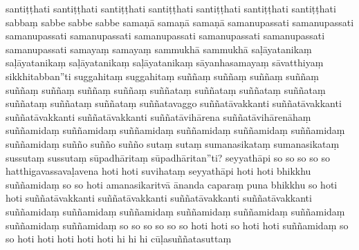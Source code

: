\documentclass[12pt]{article}
\begin{document}
\begin{multicols}{5}
santiṭṭhati
santiṭṭhati
santiṭṭhati
santiṭṭhati
santiṭṭhati
santiṭṭhati
santiṭṭhati
sabbaṃ
sabbe
sabbe
sabbe
samaṇā
samaṇā
samaṇā
samanupassati
samanupassati
samanupassati
samanupassati
samanupassati
samanupassati
samanupassati
samanupassati
samayaṃ
samayaṃ
sammukhā
sammukhā
saḷāyatanikaṃ
saḷāyatanikaṃ
saḷāyatanikaṃ
saḷāyatanikaṃ
sāyanhasamayaṃ
sāvatthiyaṃ
sikkhitabban”ti
suggahitaṃ
suggahitaṃ
suññaṃ
suññaṃ
suññaṃ
suññaṃ
suññaṃ
suññaṃ
suññaṃ
suññaṃ
suññataṃ
suññataṃ
suññataṃ
suññataṃ
suññataṃ
suññataṃ
suññataṃ
suññatavaggo
suññatāvakkanti
suññatāvakkanti
suññatāvakkanti
suññatāvakkanti
suññatāvihārena
suññatāvihārenāhaṃ
suññamidaṃ
suññamidaṃ
suññamidaṃ
suññamidaṃ
suññamidaṃ
suññamidaṃ
suññamidaṃ
suñño
suñño
suñño
sutaṃ
sutaṃ
sumanasikataṃ
sumanasikataṃ
sussutaṃ
sussutaṃ
sūpadhāritaṃ
sūpadhāritan”ti?
seyyathāpi
so
so
so
so
so
hatthigavassavaḷavena
hoti
hoti
suvihataṃ
seyyathāpi
hoti
hoti
bhikkhu
suññamidaṃ
so
so
hoti
amanasikaritvā
ānanda
caparaṃ
puna
bhikkhu
so
hoti
hoti
suññatāvakkanti
suññatāvakkanti
suññatāvakkanti
suññatāvakkanti
suññamidaṃ
suññamidaṃ
suññamidaṃ
suññamidaṃ
suññamidaṃ
suññamidaṃ
suññamidaṃ
suññamidaṃ
so
so
so
so
so
so
hoti
hoti
so
hoti
hoti
suññamidaṃ
so
so
hoti
hoti
hoti
hoti
hoti
hi
hi
hi
cūḷasuññatasuttaṃ
\end{multicols}
\end{document}
